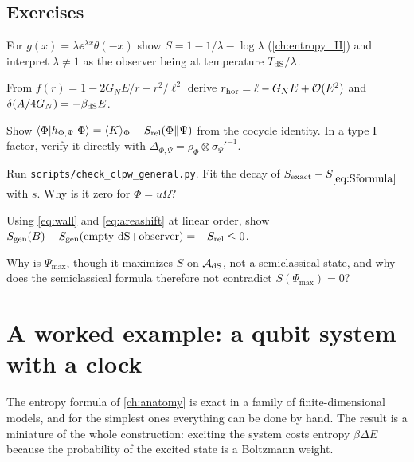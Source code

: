 \subsection*{Exercises}
\begin{exercise}\label{ex:anatomy:1}
For $g(x)=\lambda\ee^{\lambda x}\theta(-x)$ show $S=1-1/\lambda-\log\lambda$ (\cref{ch:entropy_II}) and interpret $\lambda\ne1$ as the observer being at temperature $T_{\rm dS}/\lambda$.
\end{exercise}
\begin{exercise}\label{ex:anatomy:2}
From $f(r)=1-2G_NE/r-r^2/\ell^2$ derive $r_{\rm hor}=\ell-G_NE+\mathcal O(E^2)$ and $\delta(A/4G_N)=-\beta_{\rm dS}E$.
\end{exercise}
\begin{exercise}\label{ex:anatomy:3}
Show $\langle\Phi|h_{\Phi,\Psi}|\Phi\rangle=\langle K\rangle_\Phi-S_{\rm rel}(\Phi\|\Psi)$ from the cocycle identity. In a type I factor, verify it directly with $\Delta_{\Phi,\Psi}=\rho_\Phi\otimes\sigma_\Psi'^{-1}$.
\end{exercise}
\begin{exercise}\label{ex:anatomy:4}
Run \texttt{scripts/check\_clpw\_general.py}. Fit the decay of $S_{\rm exact}-S_{\eqref{eq:Sformula}}$ with $s$. Why is it zero for $\Phi=u\Omega$?
\end{exercise}
\begin{exercise}\label{ex:anatomy:5}
Using \eqref{eq:wall} and \eqref{eq:areashift} at linear order, show $S_{\mathrm{gen}}(B)-S_{\mathrm{gen}}(\text{empty dS+observer})=-S_{\rm rel}\le0$.
\end{exercise}
\begin{exercise}\label{ex:anatomy:6}
Why is $\Psi_{\max}$, though it maximizes $S$ on $\mathcal{A}_{\rm dS}$, not a semiclassical state, and why does the semiclassical formula therefore not contradict $S(\Psi_{\max})=0$?
\end{exercise}


\section{A worked example: a qubit system with a clock}\label{ch:qubit}
\begin{physmotiv}
The entropy formula of \cref{ch:anatomy} is exact in a family of finite-dimensional models, and for the simplest ones everything can be done by hand. The result is a miniature of the whole construction: exciting the system costs entropy $\beta\Delta E$ because the probability of the excited state is a Boltzmann weight.
\end{physmotiv}

